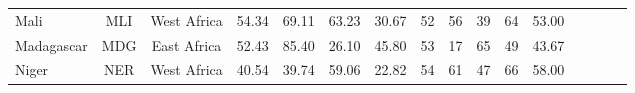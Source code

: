 \begin{singlespace}
{\begin{longtable}[H]{lccccccccccccccc}
Mali                              & MLI           & West Africa        & 54.34       & 69.11            & 63.23                     & 30.67           & 52             & 56                  & 39                           & 64                 & 53.00                  \\
Madagascar                        & MDG           & East Africa        & 52.43       & 85.40            & 26.10                     & 45.80           & 53             & 17                  & 65                           & 49                 & 43.67                  \\
Niger                             & NER           & West Africa        & 40.54       & 39.74            & 59.06                     & 22.82           & 54             & 61                  & 47                           & 66                 & 58.00                 \\
\hline \hline
\end{longtable}
}
\endgroup
\end{singlespace}
\normalsize
